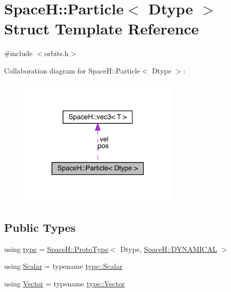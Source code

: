 \hypertarget{struct_space_h_1_1_particle}{}\section{SpaceH\+:\+:Particle$<$ Dtype $>$ Struct Template Reference}
\label{struct_space_h_1_1_particle}


{\ttfamily \#include $<$orbits.\+h$>$}



Collaboration diagram for SpaceH\+:\+:Particle$<$ Dtype $>$\+:
\nopagebreak
\begin{figure}[H]
\begin{center}
\leavevmode
\includegraphics[width=214pt]{struct_space_h_1_1_particle__coll__graph}
\end{center}
\end{figure}
\subsection*{Public Types}
\begin{DoxyCompactItemize}
\item 
using \mbox{\hyperlink{struct_space_h_1_1_particle_a4da7db09bcfc01d24c63468e6e08fa24}{type}} = \mbox{\hyperlink{struct_space_h_1_1_proto_type}{Space\+H\+::\+Proto\+Type}}$<$ Dtype, \mbox{\hyperlink{namespace_space_h_a3e55b9bc2a9e10c08ce8121bce11244a}{Space\+H\+::\+D\+Y\+N\+A\+M\+I\+C\+AL}} $>$
\item 
using \mbox{\hyperlink{struct_space_h_1_1_particle_ab84dbb32b69069c6876698eec48cc984}{Scalar}} = typename \mbox{\hyperlink{struct_space_h_1_1_proto_type_af3c8245d83d9db64749882920de5c274}{type\+::\+Scalar}}
\item 
using \mbox{\hyperlink{struct_space_h_1_1_particle_afba20bb4c28d27263de384ba6a18f5c3}{Vector}} = typename \mbox{\hyperlink{struct_space_h_1_1_proto_type_a316b81f4660b2b4fab14a8e1f23b6089}{type\+::\+Vector}}
\end{DoxyCompactItemize}
